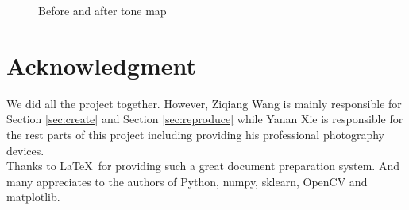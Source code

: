 \documentclass[10pt,twocolumn,letterpaper]{article}
\begin{document}
\begin{figure}[t]

\caption{Before and after tone map}
\label{fig:tonemap}
\end{figure} 


\section{Acknowledgment}
We did all the project together. However, Ziqiang Wang is mainly responsible for
Section \ref{sec:create} and Section \ref{sec:reproduce} while Yanan Xie is responsible for the rest parts of this project including providing his professional photography devices.\\

Thanks to \LaTeX\ for providing such a great document preparation system. And many appreciates to the authors of Python, numpy, sklearn, OpenCV and matplotlib.\\
\end{document}

